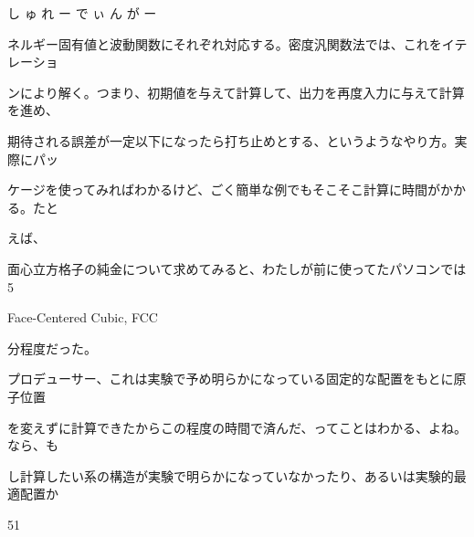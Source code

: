 し ゅ れ ー で ぃ ん が ー\par
ネルギー固有値と波動関数にそれぞれ対応する。密度汎関数法では、これをイテレーショ\par
ンにより解く。つまり、初期値を与えて計算して、出⼒を再度⼊⼒に与えて計算を進め、\par
期待される誤差が⼀定以下になったら打ち⽌めとする、というようなやり⽅。実際にパッ\par
ケージを使ってみればわかるけど、ごく簡単な例でもそこそこ計算に時間がかかる。たと\par
えば、\par
⾯⼼⽴⽅格⼦の純⾦について求めてみると、わたしが前に使ってたパソコンでは5\par
Face-Centered Cubic, FCC\par
分程度だった。\par
プロデューサー、これは実験で予め明らかになっている固定的な配置をもとに原⼦位置\par
を変えずに計算できたからこの程度の時間で済んだ、ってことはわかる、よね。なら、も\par
し計算したい系の構造が実験で明らかになっていなかったり、あるいは実験的最適配置か\par
51\par

